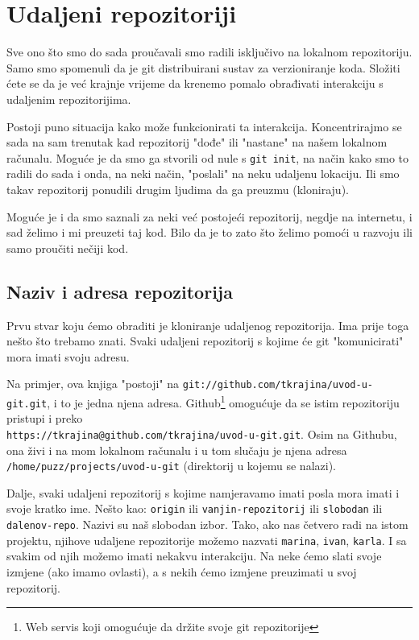 \chapter*{Udaljeni repozitoriji}

Sve ono što smo do sada proučavali smo radili isključivo na lokalnom repozitoriju.
Samo smo spomenuli da je git distribuirani sustav za verzioniranje koda. 
Složiti ćete se da je već krajnje vrijeme da krenemo pomalo obrađivati interakciju s udaljenim repozitorijima.

Postoji puno situacija kako može funkcionirati ta interakcija.
Koncentrirajmo se sada na sam trenutak kad repozitorij "dođe" ili "nastane" na našem lokalnom računalu.
Moguće je da smo ga stvorili od nule s \verb+git init+, na način kako smo to radili do sada i onda, na neki način, "poslali" na neku udaljenu lokaciju.
Ili smo takav repozitorij ponudili drugim ljudima da ga preuzmu (kloniraju).

Moguće je i da smo saznali za neki već postojeći repozitorij, negdje na internetu, i sad želimo i mi preuzeti taj kod.
Bilo da je to zato što želimo pomoći u razvoju ili samo proučiti nečiji kod.

\section*{Naziv i adresa repozitorija}

Prvu stvar koju ćemo obraditi je kloniranje udaljenog repozitorija.
Ima prije toga nešto što trebamo znati.
Svaki udaljeni repozitorij s kojime će git "komunicirati" mora imati svoju adresu.

Na primjer, ova knjiga "postoji" na \verb+git://github.com/tkrajina/uvod-u-git.git+, i to je jedna njena adresa.
Github\footnote{Web servis koji omogućuje da držite svoje git repozitorije} omogućuje da se istim repozitoriju pristupi i preko \\ \verb+https://tkrajina@github.com/tkrajina/uvod-u-git.git+.
Osim na Githubu, ona živi i na mom lokalnom računalu i u tom slučaju je njena adresa \\\verb+/home/puzz/projects/uvod-u-git+ (direktorij u kojemu se nalazi).

Dalje, svaki udaljeni repozitorij s kojime namjeravamo imati posla mora imati i svoje kratko ime.
Nešto kao: \verb+origin+ ili \verb+vanjin-repozitorij+ ili \verb+slobodan+ ili \verb+dalenov-repo+.
Nazivi su naš slobodan izbor. 
Tako, ako nas četvero radi na istom projektu, njihove udaljene repozitorije možemo nazvati \verb+marina+, \verb+ivan+, \verb+karla+.
I sa svakim od njih možemo imati nekakvu interakciju. 
Na neke ćemo slati svoje izmjene (ako imamo ovlasti), a s nekih ćemo izmjene preuzimati u svoj repozitorij.

